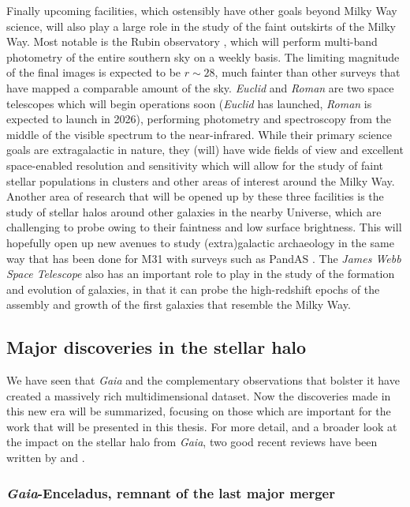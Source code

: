 Finally upcoming facilities, which ostensibly have other goals beyond Milky Way science, will also play a large role in the study of the faint outskirts of the Milky Way. Most notable is the Rubin observatory \parencite{lsst}, which will perform multi-band photometry of the entire southern sky on a weekly basis. The limiting magnitude of the final images is expected to be $r \sim 28$, much fainter than other surveys that have mapped a comparable amount of the sky. \textit{Euclid} and \textit{Roman} are two space telescopes which will begin operations soon (\textit{Euclid} has launched, \textit{Roman} is expected to launch in 2026), performing photometry and spectroscopy from the middle of the visible spectrum to the near-infrared. While their primary science goals are extragalactic in nature, they (will) have wide fields of view and excellent space-enabled resolution and sensitivity which will allow for the study of faint stellar populations in clusters and other areas of interest around the Milky Way. Another area of research that will be opened up by these three facilities is the study of stellar halos around other galaxies in the nearby Universe, which are challenging to probe owing to their faintness and low surface brightness. This will hopefully open up new avenues to study (extra)galactic archaeology in the same way that has been done for M31 with surveys such as PandAS \parencite{mcconnachie09}. The \textit{James Webb Space Telescope} also has an important role to play in the study of the formation and evolution of galaxies, in that it can probe the high-redshift epochs of the assembly and growth of the first galaxies that resemble the Milky Way.

\subsection{Major discoveries in the stellar halo}

We have seen that \textit{Gaia} and the complementary observations that bolster it have created a massively rich multidimensional dataset. Now the discoveries made in this new era will be summarized, focusing on those which are important for the work that will be presented in this thesis. For more detail, and a broader look at the impact on the stellar halo from \textit{Gaia}, two good recent reviews have been written by \textcite{helmi20} and \textcite{deason24}.

\subsubsection{\textit{Gaia}-Enceladus, remnant of the last major merger}


